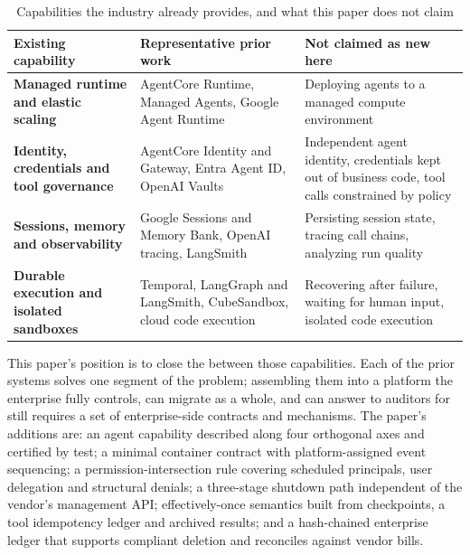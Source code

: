 \begin{table}[htbp]
\centering
\caption{Capabilities the industry already provides, and what this paper does not claim}
\label{tab:related}
\begin{tabularx}{\textwidth}{@{}>{\bfseries}L{3.4cm}L{5.2cm}Y@{}}
  \toprule
  \textbf{Existing capability} & \textbf{Representative prior work} & \textbf{Not claimed as new here}\\
  \midrule
  Managed runtime and elastic scaling & AgentCore Runtime, Managed Agents, Google Agent Runtime & Deploying agents to a managed compute environment\\
  Identity, credentials and tool governance & AgentCore Identity and Gateway, Entra Agent ID, OpenAI Vaults & Independent agent identity, credentials kept out of business code, tool calls constrained by policy\\
  Sessions, memory and observability & Google Sessions and Memory Bank, OpenAI tracing, LangSmith & Persisting session state, tracing call chains, analyzing run quality\\
  Durable execution and isolated sandboxes & Temporal, LangGraph and LangSmith, CubeSandbox, cloud code execution & Recovering after failure, waiting for human input, isolated code execution\\
  \bottomrule
\end{tabularx}
\end{table}

This paper's position is to close the  between those capabilities. Each of the prior systems solves one segment of the problem; assembling them into a platform the enterprise fully controls, can migrate as a whole, and can answer to auditors for still requires a set of enterprise-side contracts and mechanisms. The paper's additions are: an agent capability described along four orthogonal axes and certified by test; a minimal container contract with platform-assigned event sequencing; a permission-intersection rule covering scheduled principals, user delegation and structural denials; a three-stage shutdown path independent of the vendor's management API; effectively-once semantics built from checkpoints, a tool idempotency ledger and archived results; and a hash-chained enterprise ledger that supports compliant deletion and reconciles against vendor bills.
